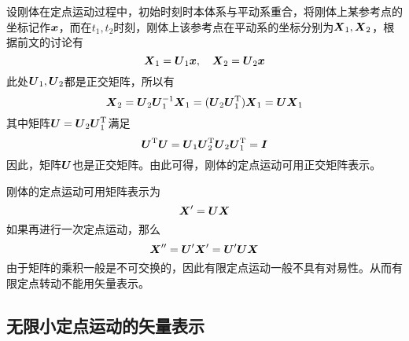 设刚体在定点运动过程中，初始时刻时本体系与平动系重合，将刚体上某参考点的坐标记作$\boldsymbol{x}$，而在$t_1,t_2$时刻，刚体上该参考点在平动系的坐标分别为$\boldsymbol{X}_1,\boldsymbol{X}_2$，根据前文的讨论有
\begin{equation*}
	\boldsymbol{X}_1 = \boldsymbol{U}_1 \boldsymbol{x},\quad \boldsymbol{X}_2 = \boldsymbol{U}_2 \boldsymbol{x}
\end{equation*}
此处$\boldsymbol{U}_1,\boldsymbol{U}_2$都是正交矩阵，所以有
\begin{equation*}
	\boldsymbol{X}_2 = \boldsymbol{U}_2 \boldsymbol{U}_1^{-1} \boldsymbol{X}_1 = (\boldsymbol{U}_2 \boldsymbol{U}_1^{\mathrm{T}}) \boldsymbol{X}_1 = \boldsymbol{U} \boldsymbol{X}_1
\end{equation*}
其中矩阵$\boldsymbol{U}=\boldsymbol{U}_2 \boldsymbol{U}_1^{\mathrm{T}}$满足
\begin{equation*}
	\boldsymbol{U}^{\mathrm{T}} \boldsymbol{U} = \boldsymbol{U}_1 \boldsymbol{U}_2^{\mathrm{T}} \boldsymbol{U}_2 \boldsymbol{U}_1^{\mathrm{T}} = \boldsymbol{I}
\end{equation*}
因此，矩阵$\boldsymbol{U}$也是正交矩阵。由此可得，刚体的定点运动可用正交矩阵表示。

\begin{example}[有限定点运动的非对易性]

刚体的定点运动可用矩阵表示为
\begin{equation*}
	\boldsymbol{X}' = \boldsymbol{U}\boldsymbol{X}
\end{equation*}
如果再进行一次定点运动，那么
\begin{equation*}
	\boldsymbol{X}'' = \boldsymbol{U}' \boldsymbol{X}' = \boldsymbol{U}' \boldsymbol{U} \boldsymbol{X}
\end{equation*}
由于矩阵的乘积一般是不可交换的，因此有限定点运动一般不具有对易性。从而有限定点转动不能用矢量表示。
\end{example}

\subsection{无限小定点运动的矢量表示}

